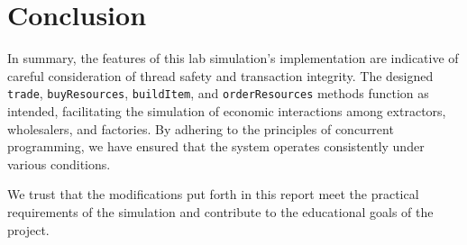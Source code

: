 \documentclass{article}
\begin{document}
    \section{Conclusion}

    In summary, the features of this lab simulation's implementation are indicative of careful consideration of thread safety
    and transaction integrity.
    The designed \texttt{trade}, \texttt{buyResources}, \texttt{buildItem}, and \texttt{orderResources} methods function as intended, facilitating the
    simulation of economic interactions
    among extractors, wholesalers, and factories. By adhering to the principles of concurrent programming, we have ensured
    that the system operates consistently
    under various conditions.

    We trust that the modifications put forth in this report meet the practical requirements of the simulation and
    contribute to the educational goals of the project.
\end{document}
